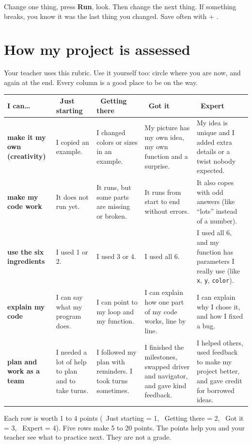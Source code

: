 \documentclass[level=1]{kidscode}
\newcommand{\lvA}{\faSeedling\ Just starting}
\newcommand{\lvB}{\faShoePrints\ Getting there}
\newcommand{\lvC}{\faCheckCircle\ Got it}
\newcommand{\lvD}{\faRocket\ Expert}
\begin{document}
\begin{tip}
Change one thing, press \textbf{Run}, look. Then change the next thing.
If something breaks, you know it was the last thing you changed.
Save often with  + .
\end{tip}

\section{How my project is assessed}
Your teacher uses this rubric. Use it yourself too: circle where you are now, and again
at the end. Every column is a good place to be on the way.

{\small\renewcommand{\arraystretch}{1.3}
\begin{tabularx}{\linewidth}{@{}>{\bfseries\RaggedRight}p{2.5cm}*{4}{>{\RaggedRight\arraybackslash}X}@{}}
\toprule
I can\dots & \lvA & \lvB & \lvC & \lvD\\
\midrule
make it my own (creativity) & I copied an example. & I changed colors or sizes in an example. & My picture has my own idea, my own function and a surprise. & My idea is unique and I added extra details or a twist nobody expected.\\
\midrule
make my code work & It does not run yet. & It runs, but some parts are missing or broken. & It runs from start to end without errors. & It also copes with odd answers (like \enquote{lots} instead of a number).\\
\midrule
use the six ingredients & I used 1 or 2. & I used 3 or 4. & I used all 6. & I used all 6, and my function has parameters I really use (like \texttt{x}, \texttt{y}, \texttt{color}).\\
\midrule
explain my code & I can say what my program does. & I can point to my loop and my function. & I can explain how one part of my code works, line by line. & I can explain why I chose it, and how I fixed a bug.\\
\midrule
plan and work as a team & I needed a lot of help to plan and to take turns. & I followed my plan with reminders. I took turns sometimes. & I finished the milestones, swapped driver and navigator, and gave kind feedback. & I helped others, used feedback to make my project better, and gave credit for borrowed ideas.\\
\bottomrule
\end{tabularx}}
\par\smallskip
{\small Each row is worth 1 to 4 points (\lvA{} = 1, \lvB{} = 2, \lvC{} = 3, \lvD{} = 4). Five rows make 5 to 20 points.
The points help you and your teacher see what to practice next. They are not a grade.\par}
\end{document}
